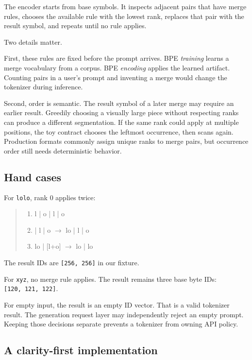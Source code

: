 The encoder starts from base symbols. It inspects adjacent pairs that
have merge rules, chooses the available rule with the lowest rank,
replaces that pair with the result symbol, and repeats until no rule
applies.

Two details matter.

First, these rules are fixed before the prompt arrives. BPE
\emph{training} learns a merge vocabulary from a corpus. BPE
\emph{encoding} applies the learned artifact. Counting pairs in a user's
prompt and inventing a merge would change the tokenizer during
inference.

Second, order is semantic. The result symbol of a later merge may
require an earlier result. Greedily choosing a visually large piece
without respecting ranks can produce a different segmentation. If the
same rank could apply at multiple positions, the toy contract chooses
the leftmost occurrence, then scans again. Production formats commonly
assign unique ranks to merge pairs, but occurrence order still needs
deterministic behavior.

\subsection{Hand cases}\label{hand-cases}

For \texttt{lolo}, rank 0 applies twice:

\begin{quote}
\begin{enumerate}
\item l | o | l | o
\item [l+o] | l | o  \(\longrightarrow\)  lo | l | o
\item lo | [l+o]      \(\longrightarrow\)  lo | lo
\end{enumerate}
\end{quote}

The result IDs are \texttt{{[}256,\ 256{]}} in our fixture.

For \texttt{xyz}, no merge rule applies. The result remains three base
byte IDs: \texttt{{[}120,\ 121,\ 122{]}}.

For empty input, the result is an empty ID vector. That is a valid
tokenizer result. The generation request layer may independently reject
an empty prompt. Keeping those decisions separate prevents a tokenizer
from owning API policy.

\subsection{A clarity-first
implementation}\label{a-clarity-first-implementation}

